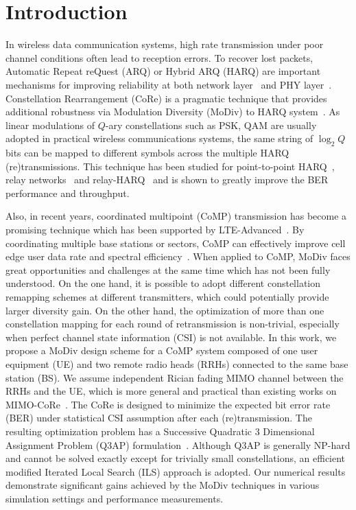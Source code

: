 \documentclass[journal,draftcls,onecolumn,12pt,twoside]{IEEEtran}
\begin{document}
\section{Introduction}
\label{sec:intro}

In wireless data communication systems, high rate transmission under poor
channel conditions often lead to reception errors. To recover lost packets,
Automatic Repeat reQuest (ARQ) or Hybrid ARQ (HARQ) are important mechanisms for
improving reliability at both network layer~\cite{TS36.331} and PHY
layer~\cite{TS36.213}. Constellation Rearrangement (CoRe) is a pragmatic
technique that provides additional robustness via Modulation Diversity (MoDiv)
to HARQ system~\cite{benelli1992new}.
As linear modulations of $Q$-ary constellations such as PSK, QAM are usually
adopted in practical wireless communications systems, the same string of
$\log_2Q$ bits can be mapped to different symbols across the multiple HARQ
(re)transmissions. This technique has been studied for point-to-point
HARQ~\cite{samra2005symbol}, relay
networks~\cite{seddik2008trans, khormuji2008rate} and
relay-HARQ~\cite{kim2009design, ryu2011ber, wu2016modulation} and is shown to
greatly improve the BER performance and throughput.

Also, in recent years, coordinated multipoint (CoMP) transmission has become a
promising technique which has been supported by
LTE-Advanced~\cite{sawahashi2010coordinated}. By coordinating multiple base
stations or sectors, CoMP can effectively improve cell edge user data rate and
spectral efficiency~\cite{irmer2011coordinated}. When applied to CoMP, MoDiv
faces great opportunities and challenges at the same time which has not been fully
understood. On the one hand,
it is possible to adopt different constellation remapping schemes at different
transmitters, which could potentially provide larger diversity gain. On the
other hand, the optimization of more than one constellation mapping for each
round of retransmission is non-trivial, especially when perfect channel state
information (CSI) is not available.
In this work, we propose a MoDiv design scheme for a CoMP system composed of one
user equipment (UE) and two remote radio heads (RRHs) connected to the same
base station (BS). We assume independent Rician fading MIMO
channel between the RRHs and the UE, which is more general and practical than
existing works on MIMO-CoRe~\cite{bahadori2014performance, zhao2009harq}.
The CoRe is designed to minimize the expected bit error rate (BER) under
statistical CSI assumption after each (re)transmission. The resulting
optimization problem has a Successive Quadratic 3 Dimensional Assignment Problem
(Q3AP) formulation~\cite{hahn2008quadratic}. Although Q3AP is generally NP-hard and
cannot be solved exactly except for trivially small constellations, an
efficient modified Iterated Local Search (ILS) approach is adopted. Our
numerical results demonstrate significant gains achieved by the MoDiv techniques
in various simulation settings and performance measurements.
\end{document}

